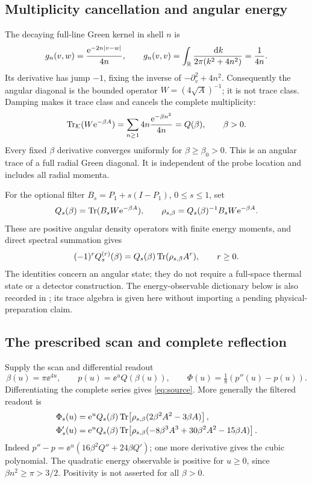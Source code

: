 \subsection{Multiplicity cancellation and angular energy}
The decaying full-line Green kernel in shell $n$ is
\begin{equation}\label{eq:green}
 g_n(v,w)=\frac{\mathrm e^{-2n|v-w|}}{4n},\qquad
 g_n(v,v)=\int_\mathbb R\frac{\,\mathrm d k}{2\pi(k^2+4n^2)}=\frac1{4n}.
\end{equation}
Its derivative has jump $-1$, fixing the inverse of
$-\partial_v^2+4n^2$. Consequently the angular diagonal is the bounded
operator $W=(4\sqrt A)^{-1}$; it is not trace class. Damping makes it
trace class and cancels the complete multiplicity:
\begin{equation}\label{eq:Q}
 \operatorname{Tr}_\mathcal K(W\mathrm e^{-\beta A})
 =\sum_{n\ge1}4n\frac{\mathrm e^{-\beta n^2}}{4n}=Q(\beta),\qquad\beta>0.
\end{equation}
Every fixed $\beta$ derivative converges uniformly for $\beta\ge\beta_0>0$.
This is an angular trace of a full radial Green diagonal. It is independent
of the probe location and includes all radial momenta.

For the optional filter $B_s=P_1+s(I-P_1)$, $0\le s\le1$, set
\[
 Q_s(\beta)=\operatorname{Tr}(B_sW\mathrm e^{-\beta A}),\qquad
 \rho_{s,\beta}=Q_s(\beta)^{-1}B_sW\mathrm e^{-\beta A}.
\]
These are positive angular density operators with finite energy moments,
and direct spectral summation gives
\begin{equation}\label{eq:energymoments}
 (-1)^rQ_s^{(r)}(\beta)=Q_s(\beta)\operatorname{Tr}(\rho_{s,\beta}A^r),\qquad r\ge0.
\end{equation}
The identities concern an angular state; they do not require a full-space
thermal state or a detector construction. The energy-observable dictionary
below is also recorded in \cite{MC11Observables}; its trace algebra is
given here without importing a pending physical-preparation claim.

\subsection{The prescribed scan and complete reflection}
Supply the scan and differential readout
\begin{equation}\label{eq:scan}
 \beta(u)=\pi\ee^{4u},\qquad p(u)=\ee^uQ(\beta(u)),\qquad
 \Phi(u)=\tfrac18(p''(u)-p(u)).
\end{equation}
Differentiating the complete series gives \eqref{eq:source}. More
generally the filtered readout is
\begin{align}
 \Phi_s(u)&=\mathrm e^u Q_s(\beta)
 \operatorname{Tr}\!\left[\rho_{s,\beta}(2\beta^2A^2-3\beta A)\right],\label{eq:sourceenergy}\\
 \Phi_s'(u)&=\mathrm e^u Q_s(\beta)
 \operatorname{Tr}\!\left[\rho_{s,\beta}(-8\beta^3A^3+30\beta^2A^2-15\beta A)\right].
 \label{eq:sourceenergyprime}
\end{align}
Indeed $p''-p=\ee^u(16\beta^2Q''+24\beta Q')$; one more derivative
gives the cubic polynomial. The quadratic energy observable is positive
for $u\ge0$, since $\beta n^2\ge\pi>3/2$. Positivity is not asserted
for all $\beta>0$.

